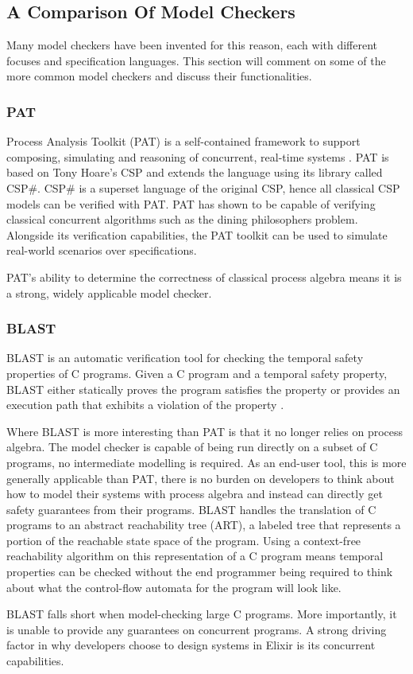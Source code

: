 \subsection{A Comparison Of Model Checkers}
Many model checkers have been invented for this reason, each with different focuses and specification languages. This section will comment on some of the more common model checkers and discuss their functionalities. \\
\subsubsection*{\textbf{PAT}}
Process Analysis Toolkit (PAT) is a self-contained framework to support composing, simulating and reasoning of concurrent, real-time systems \cite{pat}. PAT is based on Tony Hoare's CSP and extends the language using its library called CSP\#. CSP\# is a superset language of the original CSP, hence all classical CSP models can be verified with PAT. PAT has shown to be capable of verifying classical concurrent algorithms such as the dining philosophers problem. Alongside its verification capabilities, the PAT toolkit can be used to simulate real-world scenarios over specifications. 
\par
PAT's ability to determine the correctness of classical process algebra means it is a strong, widely applicable model checker.

\subsubsection*{\textbf{BLAST}}
BLAST is an automatic verification tool for checking the temporal safety properties of C programs. Given a C program and a temporal safety property, BLAST either statically proves the program satisfies the property or provides an execution path that exhibits a violation of the property \cite{blast}.
\par
Where BLAST is more interesting than PAT is that it no longer relies on process algebra. The model checker is capable of being run directly on a subset of C programs, no intermediate modelling is required. As an end-user tool, this is more generally applicable than PAT, there is no burden on developers to think about how to model their systems with process algebra and instead can directly get safety guarantees from their programs. BLAST handles the translation of C programs to an abstract reachability tree (ART), a labeled tree that represents a portion of the reachable state space of the program. Using a context-free reachability algorithm on this representation of a C program means temporal properties can be checked without the end programmer being required to think about what the control-flow automata for the program will look like.
\par
BLAST falls short when model-checking large C programs. More importantly, it is unable to provide any guarantees on concurrent programs. A strong driving factor in why developers choose to design systems in Elixir is its concurrent capabilities. 

